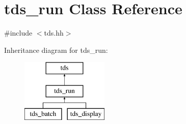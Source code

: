 \hypertarget{classtds__run}{}\section{tds\+\_\+run Class Reference}
\label{classtds__run}


{\ttfamily \#include $<$tds.\+hh$>$}

Inheritance diagram for tds\+\_\+run\+:\begin{figure}[H]
\begin{center}
\leavevmode
\includegraphics[height=3.000000cm]{classtds__run}
\end{center}
\end{figure}
